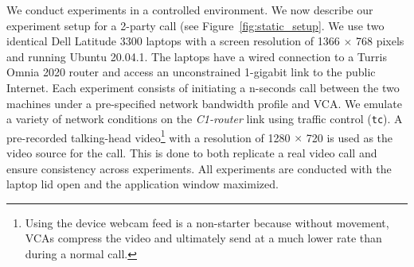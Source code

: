 We conduct experiments in a controlled environment. We now describe our experiment setup for a 2-party call (see Figure~\ref{fig:static_setup}. We use two identical
Dell Latitude 3300 laptops with a screen resolution of 1366 $\times$ 768 pixels and running Ubuntu 20.04.1. The laptops have a wired connection to a Turris Omnia 2020
router and access an unconstrained 1-gigabit link to the public Internet. Each experiment consists of initiating a n-seconds call between the two machines under a
pre-specified network bandwidth profile and VCA. We emulate a variety of network conditions on the \textit{C1-router} link using traffic control (\texttt{tc}). A
pre-recorded talking-head video\footnote{Using the device webcam feed is a non-starter because without movement, VCAs compress the video and ultimately send at a much
lower rate than during a normal call.} with a resolution of 1280 $\times$ 720 is used as the video source for the call. This is done to both replicate a real video call
and ensure consistency across experiments. All experiments are conducted with the laptop lid open and the application window maximized. %

